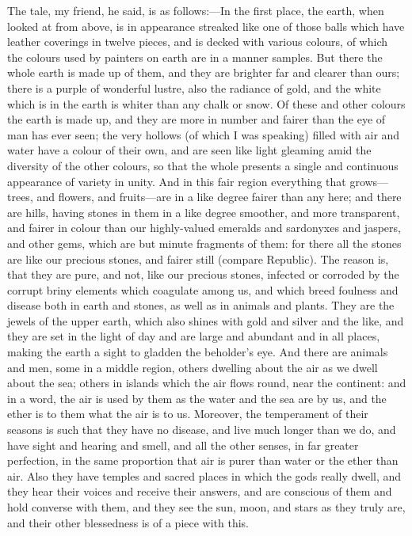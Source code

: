 The tale, my friend, he said, is as follows:—In the first place, the
earth, when looked at from above, is in appearance streaked like one of
those balls which have leather coverings in twelve pieces, and is decked
with various colours, of which the colours used by painters on earth are
in a manner samples. But there the whole earth is made up of them, and
they are brighter far and clearer than ours; there is a purple of
wonderful lustre, also the radiance of gold, and the white which is in the
earth is whiter than any chalk or snow. Of these and other colours the
earth is made up, and they are more in number and fairer than the eye of
man has ever seen; the very hollows (of which I was speaking) filled with
air and water have a colour of their own, and are seen like light gleaming
amid the diversity of the other colours, so that the whole presents a
single and continuous appearance of variety in unity. And in this fair
region everything that grows—trees, and flowers, and fruits—are
in a like degree fairer than any here; and there are hills, having stones
in them in a like degree smoother, and more transparent, and fairer in
colour than our highly-valued emeralds and sardonyxes and jaspers, and
other gems, which are but minute fragments of them: for there all the
stones are like our precious stones, and fairer still (compare Republic).
The reason is, that they are pure, and not, like our precious stones,
infected or corroded by the corrupt briny elements which coagulate among
us, and which breed foulness and disease both in earth and stones, as well
as in animals and plants. They are the jewels of the upper earth, which
also shines with gold and silver and the like, and they are set in the
light of day and are large and abundant and in all places, making the
earth a sight to gladden the beholder's eye. And there are animals and
men, some in a middle region, others dwelling about the air as we dwell
about the sea; others in islands which the air flows round, near the
continent: and in a word, the air is used by them as the water and the sea
are by us, and the ether is to them what the air is to us. Moreover, the
temperament of their seasons is such that they have no disease, and live
much longer than we do, and have sight and hearing and smell, and all the
other senses, in far greater perfection, in the same proportion that air
is purer than water or the ether than air. Also they have temples and
sacred places in which the gods really dwell, and they hear their voices
and receive their answers, and are conscious of them and hold converse
with them, and they see the sun, moon, and stars as they truly are, and
their other blessedness is of a piece with this.

